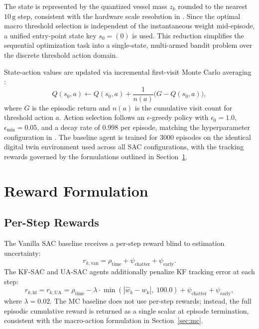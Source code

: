 \documentclass[conference]{IEEEtran}
\begin{document}
The state is represented by the quantized vessel mass $z_k$ rounded to the nearest $10\,\text{g}$ step, consistent with the hardware scale resolution in \cite{emeksiz2023}. Since the optimal macro threshold selection is independent of the instantaneous weight mid-episode, a unified entry-point state key $s_0 = (0)$ is used. This reduction simplifies the sequential optimization task into a single-state, multi-armed bandit problem over the discrete threshold action domain.

State-action values are updated via incremental first-visit Monte Carlo averaging \cite{sutton2018}:
\begin{equation}
    Q(s_0, a) \leftarrow Q(s_0, a) + \frac{1}{n(a)} \bigl(G - Q(s_0, a)\bigr),
\end{equation}
where $G$ is the episodic return and $n(a)$ is the cumulative visit count for threshold action $a$. Action selection follows an $\epsilon$-greedy policy with $\epsilon_0=1.0$, $\epsilon_\text{min}=0.05$, and a decay rate of $0.998$ per episode, matching the hyperparameter configuration in \cite{emeksiz2023, emeksiz2025}. The baseline agent is trained for 3000 episodes on the identical digital twin environment used across all SAC configurations, with the tracking rewards governed by the formulations outlined in Section~\ref{sec:reward}.

\section{Reward Formulation}
\label{sec:reward}

\subsection{Per-Step Rewards}

The Vanilla SAC baseline receives a per-step reward 
blind to estimation uncertainty:
\begin{equation}
    r_{k,\text{van}} = \rho_\text{time} + 
    \psi_\text{chatter} + \psi_\text{early}.
\end{equation}
The KF-SAC and UA-SAC agents additionally penalize 
KF tracking error at each step:
\begin{equation}
    r_{k,\text{kf}} = r_{k,\text{UA}} = \rho_\text{time} 
    - \lambda \cdot \min(|\hat{w}_k - w_k|,\;100.0) 
    + \psi_\text{chatter} + \psi_\text{early},
\end{equation}
where $\lambda = 0.02$. The MC baseline does not 
use per-step rewards; instead, the full episodic 
cumulative reward is returned as a single scalar 
at episode termination, consistent with the 
macro-action formulation in Section~\ref{sec:mc}.
\end{document}
